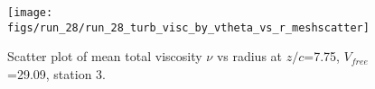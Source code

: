 \begin{figure}[H]
\centering
\texttt{[image: figs/run\_28/run\_28\_turb\_visc\_by\_vtheta\_vs\_r\_meshscatter]}
\caption{Scatter plot of mean total viscosity $\nu$ vs radius at $z/c$=7.75, $V_{free}$=29.09, station 3.}
\label{fig:run_28_turb_visc_by_vtheta_vs_r_meshscatter}
\end{figure}


